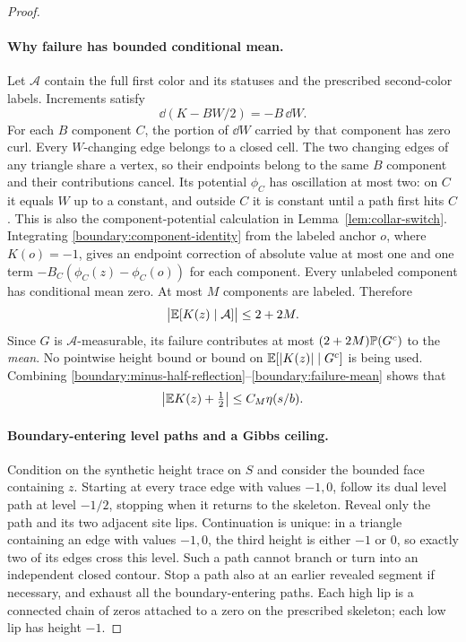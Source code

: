 \begin{proof}
\paragraph{Why failure has bounded conditional mean.}
Let $\mathcal A$ contain the full first color and its statuses and
the prescribed second-color labels.  Increments satisfy
\begin{equation}
 \dd(K-BW/2)=-B\,\dd W.
 \label{boundary:component-identity}
\end{equation}
For each $B$ component $C$, the portion of $\dd W$ carried by that
component has zero curl.  Every $W$-changing edge belongs to a closed
cell.  The two changing edges of any triangle share a vertex, so
their endpoints belong to the same $B$ component and their
contributions cancel.  Its potential $\phi_C$ has oscillation at most two:
on $C$ it equals $W$ up to a constant, and outside $C$ it is
constant until a path first hits $C$.  This is also the
component-potential calculation in Lemma~\ref{lem:collar-switch}.
Integrating \eqref{boundary:component-identity} from the labeled
anchor $o$, where $K(o)=-1$, gives an endpoint correction of absolute
value at most one and one term
$-B_C(\phi_C(z)-\phi_C(o))$ for each component.  Every unlabeled
component has conditional mean zero.  At most $M$ components are
labeled.  Therefore
\begin{equation}
 \big|\mathbb E[K(z)\mid\mathcal A]\big|\le 2+2M.
 \label{boundary:failure-mean}
\end{equation}
Since $G$ is $\mathcal A$-measurable, its failure contributes at most
$(2+2M)\mathbb P(G^c)$ to the \emph{mean}.  No pointwise height bound or
bound on $\mathbb E[|K(z)|\mid G^c]$ is being used.  Combining
\eqref{boundary:minus-half-reflection}--\eqref{boundary:failure-mean}
shows that
\begin{equation}
 \left|\mathbb E K(z)+\tfrac12\right|\le C_M\eta(s/b).
 \label{boundary:synthetic-mean}
\end{equation}

\paragraph{Boundary-entering level paths and a Gibbs ceiling.}
Condition on the synthetic height trace on $S$ and consider the
bounded face containing $z$.  Starting at every trace edge with
values $-1,0$, follow its dual level path at level $-1/2$, stopping
when it returns to the skeleton.  Reveal only the path and its two
adjacent site lips.  Continuation is unique: in a triangle containing
an edge with values $-1,0$, the third height is either $-1$ or $0$,
so exactly two of its edges cross this level.  Such a path cannot
branch or turn into an independent closed contour.  Stop a path also
at an earlier revealed segment if necessary, and exhaust all the
boundary-entering paths.  Each high lip is a connected chain of
zeros attached to a zero on the prescribed skeleton; each low lip
has height $-1$.


\end{proof}

